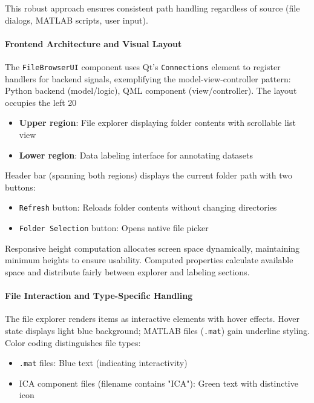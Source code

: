 \documentclass[12pt]{report}
\begin{document}
This robust approach ensures consistent path handling regardless of source (file dialogs, MATLAB scripts, user input).

\paragraph{Frontend Architecture and Visual Layout}\mbox{}

The \verb|FileBrowserUI| component uses Qt's \verb|Connections| element to register handlers for backend signals, exemplifying the model-view-controller pattern: Python backend (model/logic), QML component (view/controller). The layout occupies the left 20%

\begin{itemize}
\item \textbf{Upper region}: File explorer displaying folder contents with scrollable list view
\item \textbf{Lower region}: Data labeling interface for annotating datasets
\end{itemize}

Header bar (spanning both regions) displays the current folder path with two buttons:
\begin{itemize}
\item \verb|Refresh| button: Reloads folder contents without changing directories
\item \verb|Folder Selection| button: Opens native file picker
\end{itemize}

Responsive height computation allocates screen space dynamically, maintaining minimum heights to ensure usability. Computed properties calculate available space and distribute fairly between explorer and labeling sections.

\paragraph{File Interaction and Type-Specific Handling}\mbox{}

The file explorer renders items as interactive elements with hover effects. Hover state displays light blue background; MATLAB files (\verb|.mat|) gain underline styling. Color coding distinguishes file types:

\begin{itemize}
\item \verb|.mat| files: Blue text (indicating interactivity)
\item ICA component files (filename contains "ICA"): Green text with distinctive icon
\end{itemize}
\end{document}
